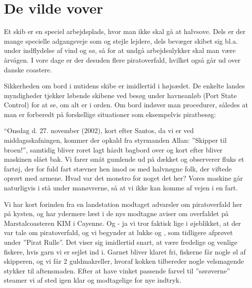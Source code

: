 \chapter{De vilde vover}\label{de-vilde-vover}

Et skib er en speciel arbejdsplads, hvor man ikke skal gå at halvsove.
Dels er der mange specielle adgangsveje som  og stejle lejdere, dels bevæger
skibet sig bl.a. under indflydelse af vind og sø, så for at undgå
arbejdsulykker skal man være årvågen. I vore dage er der desuden flere
piratoverfald, hvilket også går ud over danske coastere. 

Sikkerheden om bord i nutidens skibe er imidlertid i højsædet.
De enkelte landes myndigheder tjekker løbende skibene ved besøg under
havneanløb (Port State Control) for at se, om alt er i orden. Om bord
indøver man procedurer, således at man er forberedt på forskellige
situationer som eksempelvis piratbesøg: 

``Onsdag d. 27. november (2002),
kort efter Santos, da vi er ved middagsskafningen, kommer der opkald fra
styrmanden Allan: ''Skipper til broen!'', samtidig bliver roret lagt
hårdt bagbord over og kort efter bliver maskinen slået bak. Vi farer
småt gumlende ud på dækket og observerer fluks et fartøj, der for fuld
fart stævner hen imod os med halvnøgne folk, der viftede oprørt med
armene. Hvad var det monstro for noget det her? Vores maskine går
naturligvis i stå under manøvrerne, så at vi ikke kan komme af vejen i
en fart. 

Vi har kort forinden fra en landstation modtaget advarsler om
piratoverfald her på kysten, og har ydermere læst i de nys modtagne aviser
om overfaldet på Marstalcoasteren KIM i Cayenne. Og - ja vi tror faktisk
lige i øjeblikket, at der var tale om piratoverfald, og vi begynder at
lukke og ,
som tidligere afprøvet under ''Pirat Rulle''. Det viser sig imidlertid
snart, at være fredelige og venlige fiskere, hvis garn vi er sejlet ind i.
Garnet bliver klaret fri, fiskerne får nogle øl af skipperen, og vi får 2
guldmakreller, hvoraf kokken tilbereder nogle velsmagende stykker til
aftensmaden. Efter at have vinket passende farvel til ''sørøverne''
steamer vi af sted igen klar og modtagelige for nye indtryk.

